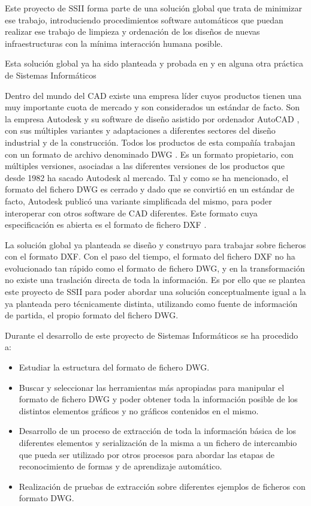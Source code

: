 Este proyecto de SSII forma parte de una solución global que trata de minimizar ese trabajo, introduciendo procedimientos software automáticos que puedan realizar ese trabajo de limpieza y ordenación de los diseños de nuevas infraestructuras con la mínima interacción humana posible.

Esta solución global ya ha sido planteada y probada en \cite{Miguel-Munoz} y en alguna otra práctica de Sistemas Informáticos \cite{Miguel-Munoz-SSII} \cite{Javier-Cabrera-SSII}

Dentro del mundo del CAD existe una empresa líder cuyos productos tienen una muy importante cuota de mercado y son considerados un estándar de facto. Son la empresa Autodesk y su software de diseño asistido por ordenador AutoCAD , con sus múltiples variantes y adaptaciones a diferentes sectores del diseño industrial y de la construcción. Todos los productos de esta compañía trabajan con un formato de archivo denominado DWG \cite{DWG-file-history}. Es un formato propietario, con múltiples versiones, asociadas a las diferentes versiones de los productos que desde 1982 ha sacado Autodesk al mercado. Tal y como se ha mencionado, el formato del fichero DWG es cerrado y dado que se convirtió en un estándar de facto, Autodesk publicó una variante simplificada del mismo, para poder interoperar con otros software de CAD diferentes. Este formato cuya especificación es abierta es el formato de fichero DXF \cite{DXF-file-history}. 

La solución global ya planteada \cite{Miguel-Munoz} se diseño y construyo para trabajar sobre ficheros con el formato DXF. Con el paso del tiempo, el formato del fichero DXF no ha evolucionado tan rápido como el formato de fichero DWG, y en la transformación no existe una traslación directa de toda la información. Es por ello que se plantea este proyecto de SSII para poder abordar una solución conceptualmente igual a la ya planteada pero técnicamente distinta, utilizando como fuente de información de partida, el propio formato del fichero DWG.

Durante el desarrollo de este proyecto de Sistemas Informáticos se ha procedido a:

\begin{itemize}

\item{Estudiar la estructura del formato de fichero DWG.}
\item{Buscar y seleccionar las herramientas más apropiadas para manipular el formato de fichero DWG y poder obtener toda la información posible de los distintos elementos gráficos y no gráficos contenidos en el mismo.}
\item{Desarrollo de un proceso de extracción de toda la información básica de los diferentes elementos y serialización de la misma a un fichero de intercambio que pueda ser utilizado por otros procesos para abordar las etapas de reconocimiento de formas y de aprendizaje automático.}
\item{Realización de pruebas de extracción sobre diferentes ejemplos de ficheros con formato DWG.}

\end{itemize}

